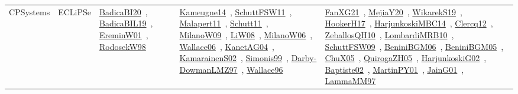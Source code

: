 {\begin{longtable}{lp{3cm}>{\raggedright\arraybackslash}p{6cm}>{\raggedright\arraybackslash}p{6cm}>{\raggedright\arraybackslash}p{8cm}}
CPSystems & ECLiPSe & \href{../works/BadicaBI20.pdf}{BadicaBI20}~\cite{BadicaBI20}, \href{../works/BadicaBIL19.pdf}{BadicaBIL19}~\cite{BadicaBIL19}, \href{../works/EreminW01.pdf}{EreminW01}~\cite{EreminW01}, \href{../works/RodosekW98.pdf}{RodosekW98}~\cite{RodosekW98} & \href{../works/Kameugne14.pdf}{Kameugne14}~\cite{Kameugne14}, \href{../works/SchuttFSW11.pdf}{SchuttFSW11}~\cite{SchuttFSW11}, \href{../works/Malapert11.pdf}{Malapert11}~\cite{Malapert11}, \href{../works/Schutt11.pdf}{Schutt11}~\cite{Schutt11}, \href{../works/MilanoW09.pdf}{MilanoW09}~\cite{MilanoW09}, \href{../works/LiW08.pdf}{LiW08}~\cite{LiW08}, \href{../works/MilanoW06.pdf}{MilanoW06}~\cite{MilanoW06}, \href{../works/Wallace06.pdf}{Wallace06}~\cite{Wallace06}, \href{../works/KanetAG04.pdf}{KanetAG04}~\cite{KanetAG04}, \href{../works/KamarainenS02.pdf}{KamarainenS02}~\cite{KamarainenS02}, \href{../works/Simonis99.pdf}{Simonis99}~\cite{Simonis99}, \href{../works/Darby-DowmanLMZ97.pdf}{Darby-DowmanLMZ97}~\cite{Darby-DowmanLMZ97}, \href{../works/Wallace96.pdf}{Wallace96}~\cite{Wallace96} & \href{../works/FanXG21.pdf}{FanXG21}~\cite{FanXG21}, \href{../works/MejiaY20.pdf}{MejiaY20}~\cite{MejiaY20}, \href{../works/WikarekS19.pdf}{WikarekS19}~\cite{WikarekS19}, \href{../works/HookerH17.pdf}{HookerH17}~\cite{HookerH17}, \href{../works/HarjunkoskiMBC14.pdf}{HarjunkoskiMBC14}~\cite{HarjunkoskiMBC14}, \href{../works/Clercq12.pdf}{Clercq12}~\cite{Clercq12}, \href{../works/ZeballosQH10.pdf}{ZeballosQH10}~\cite{ZeballosQH10}, \href{../works/LombardiMRB10.pdf}{LombardiMRB10}~\cite{LombardiMRB10}, \href{../works/SchuttFSW09.pdf}{SchuttFSW09}~\cite{SchuttFSW09}, \href{../works/BeniniBGM06.pdf}{BeniniBGM06}~\cite{BeniniBGM06}, \href{../works/BeniniBGM05.pdf}{BeniniBGM05}~\cite{BeniniBGM05}, \href{../works/ChuX05.pdf}{ChuX05}~\cite{ChuX05}, \href{../works/QuirogaZH05.pdf}{QuirogaZH05}~\cite{QuirogaZH05}, \href{../works/HarjunkoskiG02.pdf}{HarjunkoskiG02}~\cite{HarjunkoskiG02}, \href{../works/Baptiste02.pdf}{Baptiste02}~\cite{Baptiste02}, \href{../works/MartinPY01.pdf}{MartinPY01}~\cite{MartinPY01}, \href{../works/JainG01.pdf}{JainG01}~\cite{JainG01}, \href{../works/LammaMM97.pdf}{LammaMM97}~\cite{LammaMM97}\\

\end{longtable}}

